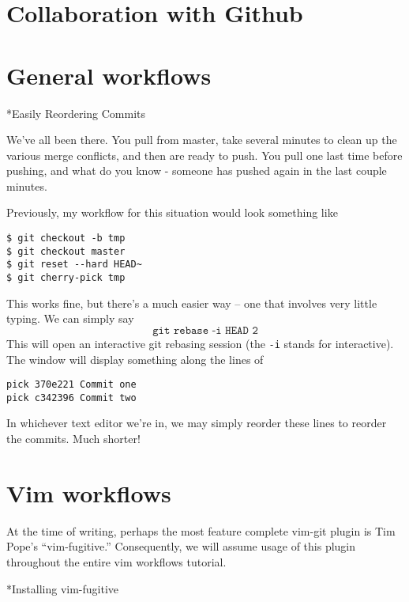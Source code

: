 \documentclass{amsart}
\makeatletter
\renewcommand\subsection{\@startsection{subsection}{2}%
  \z@{-.5\linespacing\@plus-.7\linespacing}{.5\linespacing}%
  {\normalfont\scshape}}
\makeatother
\begin{document}
\newpage

\section*{Collaboration with Github}

\newpage

\section*{General workflows}

\subsection*{Easily Reordering Commits}

We’ve all been there. You pull from master, take several minutes to clean up the various merge conflicts, and then are ready to push. You pull one last time before pushing, and what do you know - someone has pushed again in the last couple minutes.

Previously, my workflow for this situation would look something like
\begin{verbatim}
$ git checkout -b tmp
$ git checkout master
$ git reset --hard HEAD~
$ git cherry-pick tmp
\end{verbatim}

This works fine, but there’s a much easier way -- one that involves
very little typing. We can simply say
\[
  \texttt{git rebase -i HEAD~2}
\]
This will open an interactive git rebasing session (the \texttt{-i}
stands for interactive). The window will display something along the
lines of
\begin{verbatim}
pick 370e221 Commit one
pick c342396 Commit two
\end{verbatim}
In whichever text editor we’re in, we may simply reorder these lines
to reorder the commits. Much shorter!

\section*{Vim workflows}

At the time of writing, perhaps the most feature complete vim-git
plugin is Tim Pope’s “vim-fugitive.” Consequently, we will assume
usage of this plugin throughout the entire vim workflows tutorial.

\subsection*{Installing vim-fugitive}
\end{document}
